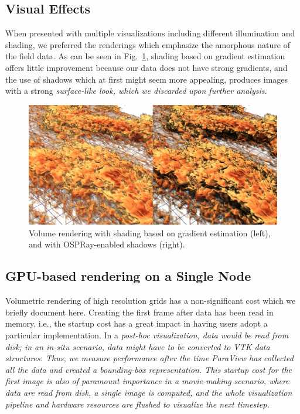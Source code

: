 \documentclass[5p,times]{elsarticle}
\begin{document}
\subsection{Visual Effects}

When presented with multiple visualizations including different illumination and
shading, we preferred the renderings which emphasize the
amorphous nature of the field data. As can be seen in Fig.~\ref{fig:shadings},
shading based on gradient estimation offers little improvement because our data
does not have strong gradients, and the use of shadows which at first might seem
more appealing, produces images with a strong \it{surface-like} \rm look, which
we discarded upon further analysis.

\begin{figure}
	\centering
	\includegraphics[width=\linewidth]{fig2montage}%
	\caption{\label{fig:shadings} Volume rendering with shading based on gradient
estimation (left), and with OSPRay-enabled shadows (right).}
\end{figure}


\subsection{GPU-based rendering on a Single Node}

Volumetric rendering of high resolution grids has a non-significant cost which we
briefly document here. Creating the first frame after data has been read in memory,
 i.e., the startup cost has a great impact in having users adopt a particular implementation.
In a \it{post-hoc} \rm visualization, data would be read from disk; in an \it{in-situ} \rm
scenario, data might have to be converted to VTK data structures. Thus, we measure performance
after the time ParaView has collected all the data and created a bounding-box representation.
This startup cost for the first image is also of paramount importance in a movie-making scenario,
where data are read from disk, a single image is computed, and the whole visualization pipeline
and hardware resources are flushed to visualize the next timestep.
\end{document}
